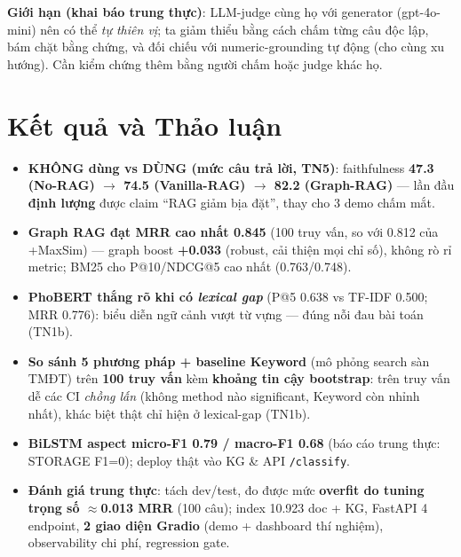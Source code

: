 \documentclass[12pt,a4paper]{article}
\begin{document}
\noindent\textbf{Giới hạn (khai báo trung thực)}: LLM-judge cùng họ với generator (gpt-4o-mini) nên có thể \textit{tự thiên vị}; ta giảm thiểu bằng cách chấm từng câu độc lập, bám chặt bằng chứng, và đối chiếu với numeric-grounding tự động (cho cùng xu hướng). Cần kiểm chứng thêm bằng người chấm hoặc judge khác họ.

\section{Kết quả và Thảo luận}

\begin{tcolorbox}[colback=blue!4,colframe=blue!55!black,title=\textbf{Kết quả nổi bật},fonttitle=\bfseries]
\begin{itemize}[leftmargin=1.4em,itemsep=2pt]
  \item \textbf{KHÔNG dùng vs DÙNG (mức câu trả lời, TN5)}: faithfulness \textbf{47.3 (No-RAG) $\to$ 74.5 (Vanilla-RAG) $\to$ 82.2 (Graph-RAG)} --- lần đầu \textbf{định lượng} được claim ``RAG giảm bịa đặt'', thay cho 3 demo chấm mắt.
  \item \textbf{Graph RAG đạt MRR cao nhất 0.845} (100 truy vấn, so với 0.812 của +MaxSim) --- graph boost \textbf{+0.033} (robust, cải thiện mọi chỉ số), không rò rỉ metric; BM25 cho P@10/NDCG@5 cao nhất (0.763/0.748).
  \item \textbf{PhoBERT thắng rõ khi có \textit{lexical gap}} (P@5 0.638 vs TF-IDF 0.500; MRR 0.776): biểu diễn ngữ cảnh vượt từ vựng --- đúng nỗi đau bài toán (TN1b).
  \item \textbf{So sánh 5 phương pháp + baseline Keyword} (mô phỏng search sàn TMĐT) trên \textbf{100 truy vấn} kèm \textbf{khoảng tin cậy bootstrap}: trên truy vấn dễ các CI \textit{chồng lấn} (không method nào significant, Keyword còn nhỉnh nhất), khác biệt thật chỉ hiện ở lexical-gap (TN1b).
  \item \textbf{BiLSTM aspect micro-F1 0.79 / macro-F1 0.68} (báo cáo trung thực: STORAGE F1=0); deploy thật vào KG \& API \texttt{/classify}.
  \item \textbf{Đánh giá trung thực}: tách dev/test, đo được mức \textbf{overfit do tuning trọng số $\approx$0.013 MRR} (100 câu); index 10.923 doc + KG, FastAPI 4 endpoint, \textbf{2 giao diện Gradio} (demo + dashboard thí nghiệm), observability chi phí, regression gate.
\end{itemize}
\end{tcolorbox}
\end{document}
